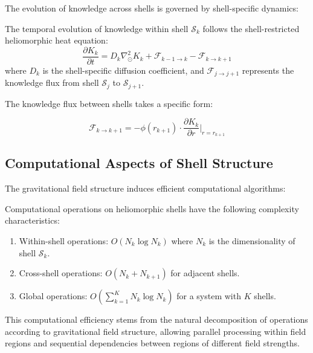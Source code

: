 The evolution of knowledge across shells is governed by shell-specific dynamics:

\begin{proposition}
The temporal evolution of knowledge within shell $\mathcal{S}_k$ follows the shell-restricted heliomorphic heat equation:
\begin{equation}
\frac{\partial K_k}{\partial t} = D_k \nabla_{\odot}^2 K_k + \mathcal{F}_{k-1 \to k} - \mathcal{F}_{k \to k+1}
\end{equation}
where $D_k$ is the shell-specific diffusion coefficient, and $\mathcal{F}_{j \to j+1}$ represents the knowledge flux from shell $\mathcal{S}_j$ to $\mathcal{S}_{j+1}$.
\end{proposition}

The knowledge flux between shells takes a specific form:

\begin{equation}
\mathcal{F}_{k \to k+1} = -\phi(r_{k+1}) \cdot \frac{\partial K_k}{\partial r}\bigg|_{r=r_{k+1}}
\end{equation}

\subsection{Computational Aspects of Shell Structure}

The gravitational field structure induces efficient computational algorithms:

\begin{theorem}
Computational operations on heliomorphic shells have the following complexity characteristics:
\begin{enumerate}
    \item Within-shell operations: $O(N_k \log N_k)$ where $N_k$ is the dimensionality of shell $\mathcal{S}_k$.
    \item Cross-shell operations: $O(N_k + N_{k+1})$ for adjacent shells.
    \item Global operations: $O(\sum_{k=1}^{K} N_k \log N_k)$ for a system with $K$ shells.
\end{enumerate}
\end{theorem}

This computational efficiency stems from the natural decomposition of operations according to gravitational field structure, allowing parallel processing within field regions and sequential dependencies between regions of different field strengths.

